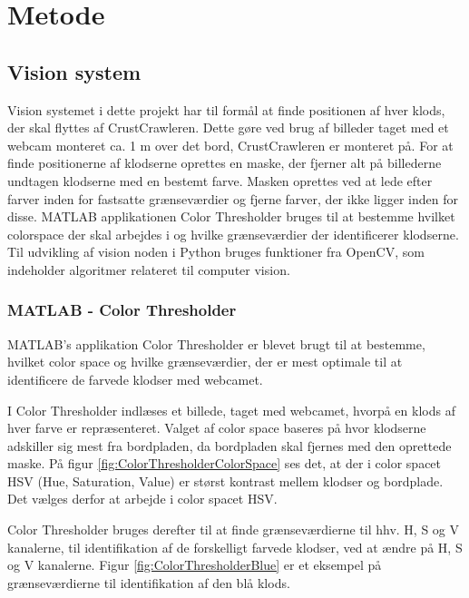 \chapter{Metode}\label{chap:Metode}

\section{Vision system}
Vision systemet i dette projekt har til formål at finde positionen af hver klods, der skal flyttes af CrustCrawleren.
Dette gøre ved brug af billeder taget med et webcam monteret ca. 1 m over det bord, CrustCrawleren er monteret på.
For at finde positionerne af klodserne oprettes en maske, der fjerner alt på billederne undtagen klodserne med en bestemt farve.
Masken oprettes ved at lede efter farver inden for fastsatte grænseværdier og fjerne farver, der ikke ligger inden for disse.
MATLAB applikationen Color Thresholder bruges til at bestemme hvilket colorspace der skal arbejdes i og hvilke grænseværdier der identificerer klodserne.
Til udvikling af vision noden i Python bruges funktioner fra OpenCV, som indeholder algoritmer relateret til computer vision.

\subsection{MATLAB - Color Thresholder}
MATLAB's  applikation Color Thresholder er blevet brugt til at bestemme, hvilket color space og hvilke grænseværdier, der er mest optimale til at identificere de farvede klodser med webcamet.

I Color Thresholder indlæses et billede, taget med webcamet, hvorpå en klods af hver farve er repræsenteret.
Valget af color space baseres på hvor klodserne adskiller sig mest fra bordpladen, da bordpladen skal fjernes med den oprettede maske.
På figur \vref{fig:ColorThresholderColorSpace} ses det, at der i color spacet HSV (Hue, Saturation, Value) er størst kontrast mellem klodser og bordplade.
Det vælges derfor at arbejde i color spacet HSV.


Color Thresholder bruges derefter til at finde grænseværdierne til hhv. H, S og V kanalerne, til identifikation af de forskelligt farvede klodser, ved at ændre på H, S og V kanalerne.
Figur \vref{fig:ColorThresholderBlue} er et eksempel på grænseværdierne til identifikation af den blå klods.

